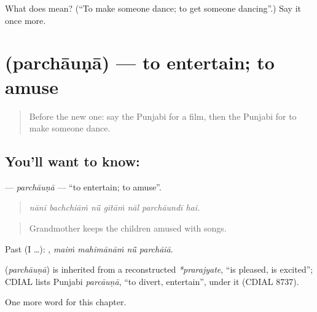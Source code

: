 \begin{tcolorbox}[breakable,colback=teal!4,colframe=teal!35!black,title={Before you move on}]
What does  mean? (\textquotedblleft{}To make someone dance; to get someone dancing\textquotedblright{}.) Say it once more.
\end{tcolorbox}
\section[\texorpdfstring{\pa{ਪਰਚਾਉਣਾ} (parchāuṇā)}{ਪਰਚਾਉਣਾ (parchāuṇā)}]{ (parchāuṇā) — to entertain; to amuse}

\label{lesson:PA-C350-parchauna}



\begin{quote}
Before the new one: say the Punjabi for a film, then the Punjabi for to make someone dance.
\end{quote}

\subsection*{You'll want to know: }
\textbf{} — \emph{parchāuṇā} — \textquotedblleft{}to entertain; to amuse\textquotedblright{}.

\begin{quote}
      
\end{quote}

\begin{quote}
\emph{nānī bachchiāṁ nū̃ gītāṁ nāl parchāundī hai.}
\end{quote}

\begin{quote}
Grandmother keeps the children amused with songs.
\end{quote}

Past (I …):    , \emph{maiṁ mahimānāṁ nū̃ parchāiā}.

\begin{cousinweb}
\textbf{} (\emph{parchāuṇā}) is inherited from a reconstructed \emph{*prarajyate}, \textquotedblleft{}is pleased, is excited\textquotedblright{}; CDIAL lists Punjabi \emph{parcāuṇā}, \textquotedblleft{}to divert, entertain\textquotedblright{}, under it (CDIAL 8737).
\end{cousinweb}

\begin{grammarlens}[title={What you've built}]
One more word for this chapter.
\end{grammarlens}

